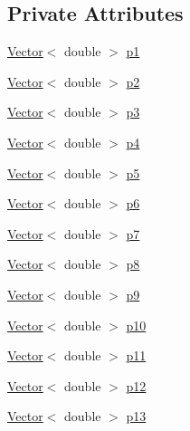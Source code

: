 \subsection*{Private Attributes}
\begin{DoxyCompactItemize}
\item 
\hyperlink{classoomph_1_1Vector}{Vector}$<$ double $>$ \hyperlink{classoomph_1_1CylinderWithFlagDomain_a22098b556345f035ddacbdf9ea1f7076}{p1}
\item 
\hyperlink{classoomph_1_1Vector}{Vector}$<$ double $>$ \hyperlink{classoomph_1_1CylinderWithFlagDomain_a518fb98d53857ffd86d1cac4c23db0d9}{p2}
\item 
\hyperlink{classoomph_1_1Vector}{Vector}$<$ double $>$ \hyperlink{classoomph_1_1CylinderWithFlagDomain_a6327976b3d8e582cfc232be01c45d975}{p3}
\item 
\hyperlink{classoomph_1_1Vector}{Vector}$<$ double $>$ \hyperlink{classoomph_1_1CylinderWithFlagDomain_a060890ea588f8e5833d518fa707fe774}{p4}
\item 
\hyperlink{classoomph_1_1Vector}{Vector}$<$ double $>$ \hyperlink{classoomph_1_1CylinderWithFlagDomain_ad4f4179e51afb966f11b999ef9ddd0a9}{p5}
\item 
\hyperlink{classoomph_1_1Vector}{Vector}$<$ double $>$ \hyperlink{classoomph_1_1CylinderWithFlagDomain_a8af35f3606195d1bab1da58102b7fa15}{p6}
\item 
\hyperlink{classoomph_1_1Vector}{Vector}$<$ double $>$ \hyperlink{classoomph_1_1CylinderWithFlagDomain_ae0aaa23dad312e7ea308e98b59015a51}{p7}
\item 
\hyperlink{classoomph_1_1Vector}{Vector}$<$ double $>$ \hyperlink{classoomph_1_1CylinderWithFlagDomain_a20743a18902498e2537f557da2fec123}{p8}
\item 
\hyperlink{classoomph_1_1Vector}{Vector}$<$ double $>$ \hyperlink{classoomph_1_1CylinderWithFlagDomain_a8ff949c600451d8cc9e53fc9b204dd79}{p9}
\item 
\hyperlink{classoomph_1_1Vector}{Vector}$<$ double $>$ \hyperlink{classoomph_1_1CylinderWithFlagDomain_af9fe7cd9299c2fe162804d60455609c6}{p10}
\item 
\hyperlink{classoomph_1_1Vector}{Vector}$<$ double $>$ \hyperlink{classoomph_1_1CylinderWithFlagDomain_af209469424b0b515eedb4587901453b6}{p11}
\item 
\hyperlink{classoomph_1_1Vector}{Vector}$<$ double $>$ \hyperlink{classoomph_1_1CylinderWithFlagDomain_a8cd9138a4f584d439da6264e5aa65d2e}{p12}
\item 
\hyperlink{classoomph_1_1Vector}{Vector}$<$ double $>$ \hyperlink{classoomph_1_1CylinderWithFlagDomain_af96f841048a399c0d5b7cd4519c22d72}{p13}

\end{DoxyCompactItemize}
